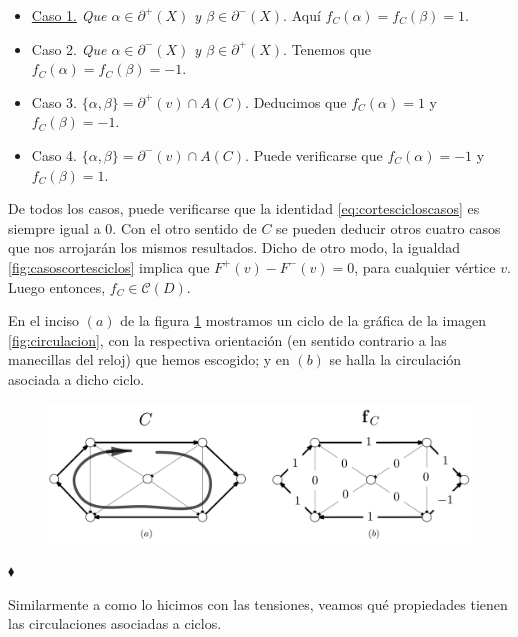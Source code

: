 \begin{itemize}
   \item \underline{Caso 1.}  \textit{Que $\alpha \in \partial^{+}(X)$ y $\beta \in \partial^{-}(X)$}. Aquí $f_{C} (\alpha)= f_{C}(\beta) = 1.$

\item {Caso 2.} \textit{Que $\alpha \in \partial^{-}(X)$ y $\beta \in \partial^{+}(X)$}. Tenemos que $f_{C} (\alpha)= f_{C}(\beta) = -1$.

\item {Caso 3.} $\{\alpha, \beta\} = \partial^{+}(v) \cap A(C)$. Deducimos que $f_{C}(\alpha)=1$ y $f_{C}(\beta)=-1.$

\item {Caso 4.} $\{\alpha, \beta\} = \partial^{-}(v) \cap A(C)$. Puede verificarse que $f_{C}(\alpha)= -1$ y $f_{C}(\beta)=1.$ 
\end{itemize}


De todos los casos, puede verificarse que la identidad \ref{eq:cortescicloscasos} es siempre igual a $0$. Con el otro sentido de $C$ se pueden deducir otros cuatro casos que nos arrojarán los mismos resultados. Dicho de otro modo, la igualdad \ref{fig:casoscortesciclos} implica que $F^{+}(v) - F^{-}(v) = 0$, para cualquier vértice $v$. Luego entonces, $f_{C} \in \mathcal{C}(D)$. 

\begin{ejem}
En el inciso $(a)$ de la figura \ref{fig:circulacionciclo} mostramos un ciclo de la gráfica de la imagen \ref{fig:circulacion}, con la respectiva orientación (en sentido contrario a las manecillas del reloj) que hemos escogido; y en $(b)$ se halla la circulación asociada a dicho ciclo.
\begin{figure}[H]
    \centering
    \includegraphics[scale=0.19]{img/imgchapter2/circulacionciclo.jpg}
    \caption{}
    \label{fig:circulacionciclo}
\end{figure}
\hfill $\blacklozenge$
\end{ejem}

Similarmente a como lo hicimos con las tensiones, veamos qué propiedades tienen las circulaciones asociadas a ciclos.

